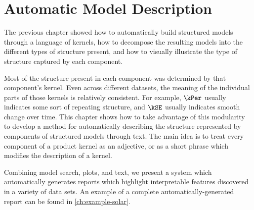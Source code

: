 
\inbpdocument


\chapter{Automatic Model Description}
\label{ch:description}






The previous chapter showed how to automatically build structured models through a language of kernels, how to decompose the resulting models into the different types of structure present, and how to visually illustrate the type of structure captured by each component.

Most of the structure present in each component was determined by that component's kernel.
Even across different datasets, the meaning of the individual parts of those kernels is relatively consistent.  For example, $\kPer$ usually indicates some sort of repeating structure, and $\kSE$ usually indicates smooth change over time.
This chapter shows how to take advantage of this modularity to develop a method for automatically describing the structure represented by components of structured \gp{} models through text.
The main idea is to treat every component of a product kernel as an adjective, or as a short phrase which modifies the description of a kernel.

Combining model search, plots, and text, we present a system which automatically generates reports which highlight interpretable features discovered in a variety of data sets.
An example of a complete automatically-generated report can be found in \cref{ch:example-solar}.

